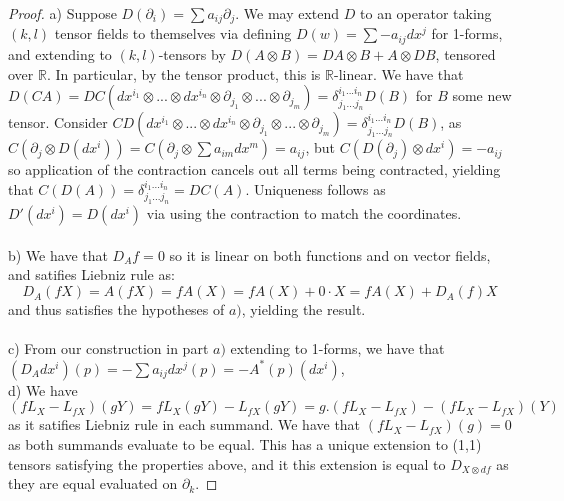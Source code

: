 \documentclass{article}
\begin{document}
\begin{proof}
  a) Suppose $D(\partial_{i}) = \sum a_{ij}\partial_{j}$. We may extend $D$ to an operator taking $(k,l)$ tensor fields to themselves via defining $D(w) = \sum -a_{ij} dx^{j}$ for 1-forms, and extending to $(k,l)$-tensors by $D(A \otimes B) = DA \otimes B + A \otimes DB$, tensored over $\mathbb{R}$. In particular, by the tensor product, this is $\mathbb{R}$-linear. We have that $D(CA) = DC(dx^{i_{1}} \otimes ... \otimes dx^{i_{n}} \otimes \partial_{j_{1}} \otimes ... \otimes \partial_{j_{m}}) = \delta_{j_{1}...j_{n}}^{i_{1}...i_{n}}D(B)$ for $B$ some new tensor. Consider $CD(dx^{i_{1}} \otimes ... \otimes dx^{i_{n}} \otimes \partial_{j_{1}} \otimes ... \otimes \partial_{j_{m}}) = \delta_{j_{1}...j_{n}}^{i_{1}...i_{n}}D(B)$, as $C(\partial_{j} \otimes D(dx^{i})) = C(\partial_{j} \otimes \sum a_{im}dx^{m}) = a_{ij}$, but $C(D(\partial_{j}) \otimes dx^{i}) = -a_{ij}$ so application of the contraction cancels out all terms being contracted, yielding that $C(D(A)) = \delta_{j_{1}...j_{n}}^{i_{1}...i_{n}} = DC(A)$. Uniqueness follows as $D'(dx^{i}) = D(dx^{i})$ via using the contraction to match the coordinates. \\ \\

  b) We have that $D_{A}f = 0$ so it is linear on both functions and on vector fields, and satifies Liebniz rule as:
  \[
    D_{A}(fX) =  A(fX) = fA(X) = fA(X) + 0 \cdot X = fA(X) + D_{A}(f) X 
  \]
  and thus satisfies the hypotheses of $a)$, yielding the result. \\ \\
  c) From our construction in part $a)$ extending to 1-forms, we have that $(D_{A}dx^{i})(p) = - \sum a_{ij}dx^{j}(p) = -A^{*}(p)(dx^{i})$, \\
  d) We have $(fL_{X} - L_{fX})(gY) = fL_{X}(gY) - L_{fX}(gY) = g.(fL_{X} - L_{fX}) - (fL_{X} - L_{fX})(Y)$ as it satifies Liebniz rule in each summand. We have that $(fL_{X}- L_{fX})(g) = 0$ as both summands evaluate to be equal. This has a unique extension to (1,1) tensors satisfying the properties above, and it this extension is equal to $D_{X \otimes df}$ as they are equal evaluated on $\partial_{k}$.
\end{proof}
\end{document}
